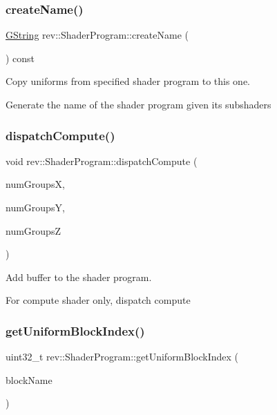 \mbox{\label{classrev_1_1_shader_program_ae594fae38b27c8ee8cc2d78ef418db8c}} 
\subsubsection{\texorpdfstring{createName()}{createName()}}
{\footnotesize\ttfamily \mbox{\hyperlink{classrev_1_1_g_string}{G\+String}} rev\+::\+Shader\+Program\+::create\+Name (\begin{DoxyParamCaption}{ }\end{DoxyParamCaption}) const}



Copy uniforms from specified shader program to this one. 

Generate the name of the shader program given it\textquotesingle{}s subshaders \mbox{\label{classrev_1_1_shader_program_aa7b7f1acfd59f0fdb168c2643d8654c2}} 
\subsubsection{\texorpdfstring{dispatchCompute()}{dispatchCompute()}}
{\footnotesize\ttfamily void rev\+::\+Shader\+Program\+::dispatch\+Compute (\begin{DoxyParamCaption}\item[{uint32\+\_\+t}]{num\+GroupsX,  }\item[{uint32\+\_\+t}]{num\+GroupsY,  }\item[{uint32\+\_\+t}]{num\+GroupsZ }\end{DoxyParamCaption})}



Add buffer to the shader program. 

For compute shader only, dispatch compute \mbox{\label{classrev_1_1_shader_program_a9d5620c172452745135a331b901a25f6}} 
\subsubsection{\texorpdfstring{getUniformBlockIndex()}{getUniformBlockIndex()}}
{\footnotesize\ttfamily uint32\+\_\+t rev\+::\+Shader\+Program\+::get\+Uniform\+Block\+Index (\begin{DoxyParamCaption}\item[{const Q\+String \&}]{block\+Name }\end{DoxyParamCaption})\hspace{0.3cm}{\ttfamily [protected]}}



